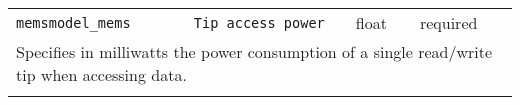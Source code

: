 \noindent 
\begin{tabular}{|p{\lpmodwidth}|p{\lpnamewidth}|p{0.5in}|p{0.5in}|}
\cline{1-4}
\texttt{memsmodel\_mems} & \texttt{Tip access power} & float & required \\ 
\cline{1-4}
\multicolumn{4}{|p{6in}|}{
Specifies in milliwatts the power consumption of a single read/write
tip when accessing data.
}\\ 
\cline{1-4}
\multicolumn{4}{p{5in}}{}\\
\end{tabular}\\ 
